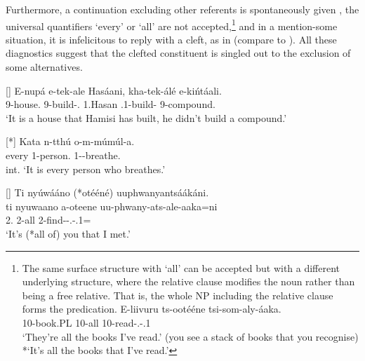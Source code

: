 \documentclass[output=paper]{langscibook}
\begin{document}
Furthermore, a continuation excluding other referents is spontaneously given , the universal quantifiers ‘every’  or ‘all’  are not accepted,\footnote{The same surface structure with ‘all’ can be accepted but with a different underlying structure, where the relative clause modifies the noun rather than being a free relative. That is, the whole NP including the relative clause forms the predication.
\ea
\gll
  E-liivuru  ts{}-ootééne  tsi{}-som{}-aly{}-áaka.\\
  10-book.PL  10-all  10-read-\PFV{}.\REL{}-\POSS{}.1\SG{}\\
  \glt ‘They’re all the books I’ve read.’ (you see a stack of books that you recognise)\\
  *‘It’s all the books that I’ve read.’
  \zlast
}
and in a mention-some situation, it is infelicitous to reply with a cleft, as in  (compare to ). All these diagnostics suggest that the clefted constituent is singled out to the exclusion of some alternatives.

\ea
[]{
\label{bkm:Ref96771985}
\gll
E-nupá  e{}-tek{}-ale  Hasáani,  kha{}-tek{}-álé  e{}-ki\'{n}táali.\\
9-house.\PRL{}  9-build-\PFV{}.\REL{}  1.Hasan  \NEG{}.1-build-\PFV{}  9-compound.\\
\glt
‘It is a house that Hamisi has built, he didn’t build a compound.’\\
}

\z

\ea
[*]{
\label{bkm:Ref96772046}
\gll
Kata  n-tthú  o-m-múmúl-a.\\
every  1-person.\PRL{}  1-\PRS{}-breathe.\REL{}\\
\glt
int. ‘It is every person who breathes.’\\
}

\z

\ea
[]{
\label{bkm:Ref109582797}
Ti nyúwááno (*otééné) uuphwanyantsáákáni.\\
\gll
ti  nyuwaano  a-oteene  uu-phwany-ats-ale-aaka=ni\\
\COP{}  2\PL{}.\PRO{}  2{}-all  2\PL{}-find-\PLUR{}-\PFV{}.\REL{}-\POSS{}.1\SG{}=\PLA{}\\
\glt
‘It’s (*all of) you that I met.’\\
}
\end{document}
